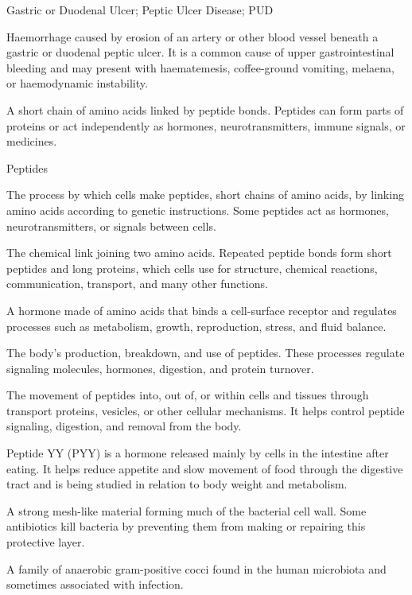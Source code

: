 \synonyms
Gastric or Duodenal Ulcer; Peptic Ulcer Disease; PUD

 Haemorrhage caused by erosion of an artery or other blood vessel beneath a gastric or
duodenal peptic ulcer. It is a common cause of upper gastrointestinal bleeding and may
present with haematemesis, coffee-ground vomiting, melaena, or haemodynamic instability.


 A short chain of amino acids linked by peptide bonds. Peptides can form parts of proteins or act independently as hormones, neurotransmitters, immune signals, or medicines.

\synonyms
Peptides

 The process by which cells make peptides, short chains of amino acids, by linking amino acids according to genetic instructions. Some peptides act as hormones, neurotransmitters, or signals between cells.

 The chemical link joining two amino acids. Repeated peptide bonds form short peptides and long proteins, which cells use for structure, chemical reactions, communication, transport, and many other functions.

 A hormone made of amino acids that binds a cell-surface receptor and regulates processes such as metabolism, growth, reproduction, stress, and fluid balance.

 The body's production, breakdown, and use of peptides. These processes regulate signaling molecules, hormones, digestion, and protein turnover.

 The movement of peptides into, out of, or within cells and tissues through transport proteins, vesicles, or other cellular mechanisms. It helps control peptide signaling, digestion, and removal from the body.

 Peptide YY (PYY) is a hormone released mainly by cells in the intestine after eating. It helps reduce appetite and slow movement of food through the digestive tract and is being studied in relation to body weight and metabolism.

 A strong mesh-like material forming much of the bacterial cell wall. Some antibiotics kill bacteria by preventing them from making or repairing this protective layer.

 A family of anaerobic gram-positive cocci found in the human microbiota and sometimes associated with infection.

